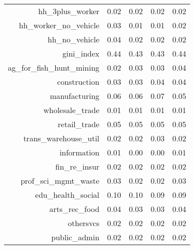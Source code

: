 \begin{table}[ht]
\begin{tabular}{rrrrr}
      hh\_3plus\_worker & 0.02 & 0.02 & 0.02 & 0.02 \\ 
      hh\_worker\_no\_vehicle & 0.03 & 0.01 & 0.01 & 0.02 \\ 
      hh\_no\_vehicle & 0.04 & 0.02 & 0.02 & 0.02 \\ 
      gini\_index & 0.44 & 0.43 & 0.43 & 0.44 \\ 
      ag\_for\_fish\_hunt\_mining & 0.02 & 0.03 & 0.03 & 0.04 \\ 
      construction & 0.03 & 0.03 & 0.04 & 0.04 \\ 
      manufacturing & 0.06 & 0.06 & 0.07 & 0.05 \\ 
      wholesale\_trade & 0.01 & 0.01 & 0.01 & 0.01 \\ 
      retail\_trade & 0.05 & 0.05 & 0.05 & 0.05 \\ 
      trans\_warehouse\_util & 0.02 & 0.02 & 0.03 & 0.02 \\ 
      information & 0.01 & 0.00 & 0.00 & 0.01 \\ 
      fin\_re\_insur & 0.02 & 0.02 & 0.02 & 0.02 \\ 
      prof\_sci\_mgmt\_waste & 0.03 & 0.02 & 0.02 & 0.03 \\ 
      edu\_health\_social & 0.10 & 0.10 & 0.09 & 0.09 \\ 
      arts\_rec\_food & 0.04 & 0.03 & 0.03 & 0.04 \\ 
      othersvcs & 0.02 & 0.02 & 0.02 & 0.02 \\ 
      public\_admin & 0.02 & 0.02 & 0.02 & 0.02 \\ 
       \hline
    \end{tabular}
    \end{table}
\endinput